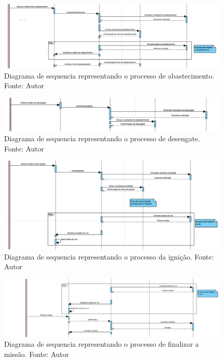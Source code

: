 \begin{apendicesenv}
\begin{figure}[htb]
    \centering
    \includegraphics[width=1\textwidth, angle=0]{figuras/diagrama_sequencia_abastecimento.png}
    \caption{Diagrama de sequencia representando o processo de abastecimento. Fonte: Autor}
    \label{fig:Diagrama_sequencia_abastecimento}
\end{figure}

\begin{figure}[htb]
    \centering
    \includegraphics[width=1\textwidth, angle=0]{figuras/diagrama_sequencia_desengate.png}
    \caption{Diagrama de sequencia representando o processo de desengate. Fonte: Autor}
    \label{fig:Diagrama_sequencia_desengate}
\end{figure}

\begin{figure}[htb]
    \centering
    \includegraphics[width=1\textwidth, angle=0]{figuras/diagrama_sequencia_ignicao.png}
    \caption{Diagrama de sequencia representando o processo da ignição. Fonte: Autor}
    \label{fig:Diagrama_sequencia_ignicao}
\end{figure}

\begin{figure}[htb]
    \centering
    \includegraphics[width=1\textwidth, angle=0]{figuras/diagrama_sequencia_finaliza_missao.png}
    \caption{Diagrama de sequencia representando o processo de finalizar a missão. Fonte: Autor}
    \label{fig:Diagrama_sequencia_finaliza_missao}
\end{figure}


\end{apendicesenv}
